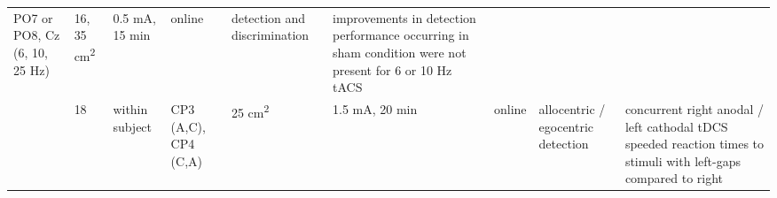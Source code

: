 \documentclass[11pt,]{memoir}
\begin{document}
\begin{longtable}[]{@{}lllllllll@{}}
\begin{minipage}[t]{0.11\columnwidth}
PO7 or PO8, Cz (6, 10, 25
Hz)\strut
\end{minipage} & \begin{minipage}[t]{0.03\columnwidth}\raggedright
16,
35
cm\textsuperscript{2}\strut
\end{minipage} & \begin{minipage}[t]{0.05\columnwidth}\raggedright
0.5 mA, 15
min\strut
\end{minipage} & \begin{minipage}[t]{0.05\columnwidth}\raggedright
online\strut
\end{minipage} & \begin{minipage}[t]{0.11\columnwidth}\raggedright
detection and
discrimination\strut
\end{minipage} & \begin{minipage}[t]{0.24\columnwidth}\raggedright
improvements in detection performance occurring in sham
condition were not present for 6 or 10 Hz tACS\strut
\end{minipage}\tabularnewline
\begin{minipage}[t]{0.12\columnwidth}\raggedright
\textcite{Medina2013}\strut
\end{minipage} & \begin{minipage}[t]{0.02\columnwidth}\raggedright
18\strut
\end{minipage} & \begin{minipage}[t]{0.04\columnwidth}\raggedright
within
subject\strut
\end{minipage} & \begin{minipage}[t]{0.11\columnwidth}\raggedright
CP3 (A,C), CP4 (C,A)\strut
\end{minipage} & \begin{minipage}[t]{0.03\columnwidth}\raggedright
25
cm\textsuperscript{2}\strut
\end{minipage} & \begin{minipage}[t]{0.05\columnwidth}\raggedright
1.5 mA, 20
min\strut
\end{minipage} & \begin{minipage}[t]{0.05\columnwidth}\raggedright
online\strut
\end{minipage} & \begin{minipage}[t]{0.11\columnwidth}\raggedright
allocentric / egocentric
detection\strut
\end{minipage} & \begin{minipage}[t]{0.24\columnwidth}\raggedright
concurrent right anodal / left cathodal tDCS speeded
reaction times to stimuli with left-gaps compared to right

\end{minipage}
\end{longtable}
\end{document}
